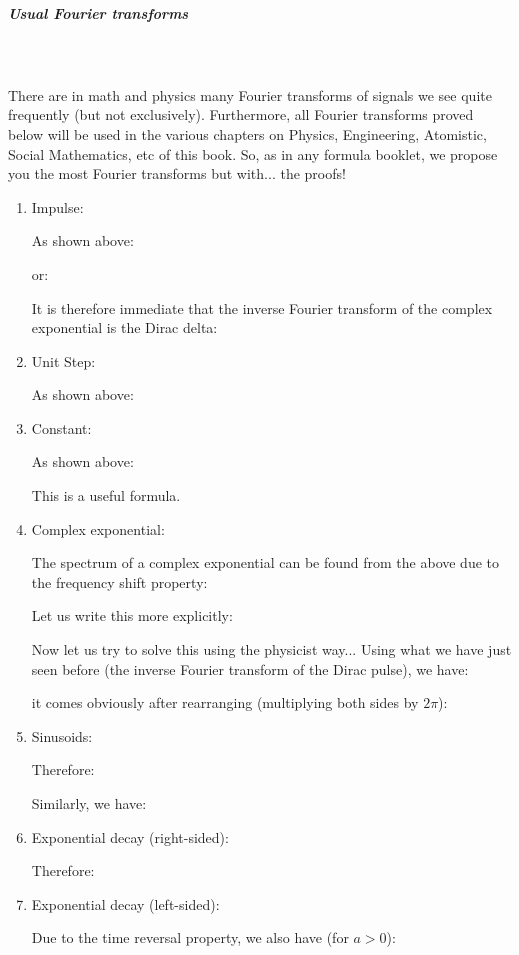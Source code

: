	\pagebreak
	\subparagraph{Usual Fourier transforms}\label{usual Fourier transforms}\mbox{}\\\\
	There are in math and physics many Fourier transforms of signals we see quite frequently (but not exclusively). Furthermore, all Fourier transforms proved below will be used in the various chapters on Physics, Engineering, Atomistic, Social Mathematics, etc of this book. So, as in any formula booklet, we propose you the most Fourier transforms but with... the proofs!
	\begin{enumerate}
	
	\item Impulse:
	
	As shown above:
	
	or:
	
	It is therefore immediate that the inverse Fourier transform of the complex exponential is the Dirac delta:
	
	
	\item Unit Step:
	
	As shown above:
	
	
	\item Constant:
	
	As shown above:
	
	This is a useful formula.
	
	\item Complex exponential:
	
	The spectrum of a complex exponential can be found from the above due to the frequency shift property:
	
	Let us write this more explicitly:
	
	Now let us try to solve this using the physicist way... Using what we have just seen before (the inverse Fourier transform of the Dirac pulse), we have:
	
	it comes obviously after rearranging (multiplying both sides by $2\pi$):
	
	
	\item Sinusoids:
	
	
	Therefore:
	
	Similarly, we have:
	
	
	\item Exponential decay (right-sided):
	
	Therefore:
	
	
	\item Exponential decay (left-sided):
	
	Due to the time reversal property, we also have (for $a>0$):
	

\end{enumerate}
